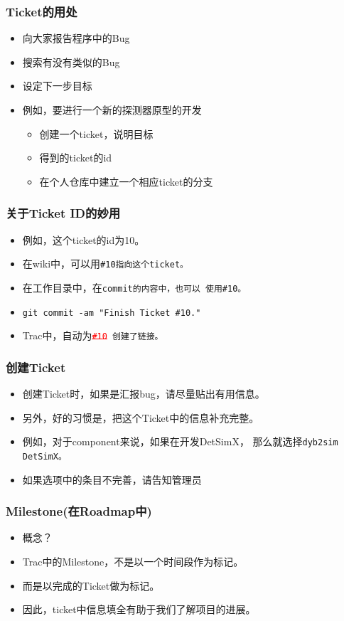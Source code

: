 \begin{frame}
    \frametitle{Ticket的用处}
    \begin{itemize}    
        \item 向大家报告程序中的Bug
        \item 搜索有没有类似的Bug
        \item 设定下一步目标
        \item 例如，要进行一个新的探测器原型的开发
            \begin{itemize}
                \item 创建一个ticket，说明目标
                \item 得到的ticket的id
                \item 在个人仓库中建立一个相应ticket的分支
            \end{itemize}
    \end{itemize}
\end{frame}

\begin{frame}
    \frametitle{关于Ticket ID的妙用}
    \begin{itemize}    
        \item 例如，这个ticket的id为10。
        \item 在wiki中，可以用\tt{\#10}指向这个ticket。
        \item 在工作目录中，在\tt{commit}的内容中，也可以
              使用\tt{\#10}。
        \item \tt{\scriptsize{git commit -am "Finish Ticket \#10."}}
        \item Trac中，自动为\tt\textcolor{red}{{\sout{\#10}}} 创建了链接。
    \end{itemize}
\end{frame}

\begin{frame}
    \frametitle{创建Ticket}
    \begin{itemize}    
        \item 创建Ticket时，如果是汇报bug，请尽量贴出有用信息。
        \item 另外，好的习惯是，把这个Ticket中的信息补充完整。
        \item 例如，对于component来说，如果在开发DetSimX，
              那么就选择\tt{dyb2sim DetSimX}。
        \item 如果选项中的条目不完善，请告知管理员
    \end{itemize}
\end{frame}

\begin{frame}
    \frametitle{Milestone(在Roadmap中)}
    \begin{itemize}    
        \item 概念？
        \item Trac中的Milestone，不是以一个时间段作为标记。
        \item 而是以完成的Ticket做为标记。
        \item 因此，ticket中信息填全有助于我们了解项目的进展。
    \end{itemize}
\end{frame}

